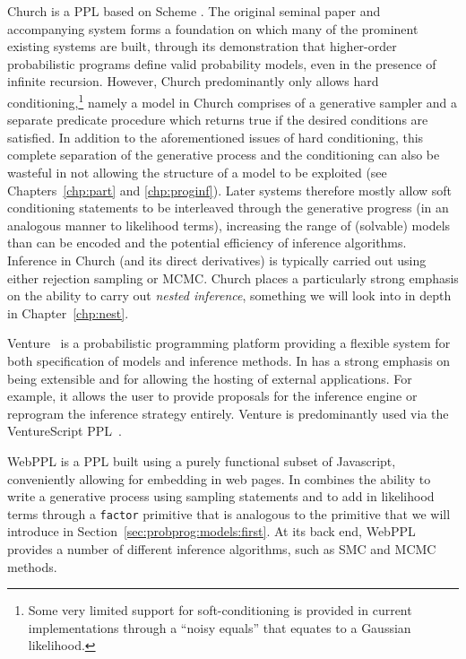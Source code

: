 Church is a PPL based on Scheme \citep{goodman_uai_2008}.  
The original seminal paper and accompanying system 
	forms a foundation on which many of the prominent existing systems are built, through its
	demonstration that higher-order probabilistic programs define valid probability models, even in
	the presence of infinite recursion.  However, Church predominantly only allows hard
		conditioning,\footnote{Some very limited support for soft-conditioning is provided in current
		implementations through a ``noisy equals'' that equates to a Gaussian likelihood.}
	namely a model in Church comprises of a generative sampler and a separate predicate procedure
	which returns true if the desired conditions are satisfied.  
	In addition to the aforementioned issues of hard conditioning, this complete separation of the 
	generative process and the conditioning can also be wasteful in not allowing the structure of a 
	model to be exploited (see Chapters~\ref{chp:part} and \ref{chp:proginf}).  
	Later systems therefore mostly allow soft conditioning statements to be interleaved
	through the generative progress (in an analogous manner to likelihood terms), increasing the range
	of (solvable) models than can be encoded and the potential efficiency of inference algorithms.
	Inference in Church (and its direct derivatives) is typically carried out using either rejection sampling
	or MCMC.  Church places a particularly strong emphasis on the ability to carry out \emph{nested inference},
	something we will look into in depth in Chapter~\ref{chp:nest}.

Venture~\citep{mansinghka2014venture} is a probabilistic programming platform providing a flexible
system for both specification of models and inference methods.  In has a strong emphasis on being extensible
and for allowing the hosting of external applications.  For example, it allows the user to provide proposals for
the inference engine or reprogram the inference strategy entirely.  Venture is predominantly used via the
VentureScript PPL~\citep{mansinghka2014venture}.

WebPPL \citep{goodman_book_2014} is a PPL built using a purely functional subset of Javascript,
conveniently allowing for embedding in web pages.
In combines the ability to write a generative process using sampling statements and to add in likelihood
terms through a {\small \texttt{factor}} primitive that is analogous to the \observe primitive that we will introduce
in Section~\ref{sec:probprog:models:first}.  At its back end, WebPPL provides a number of different inference
algorithms, such as SMC and MCMC methods.

